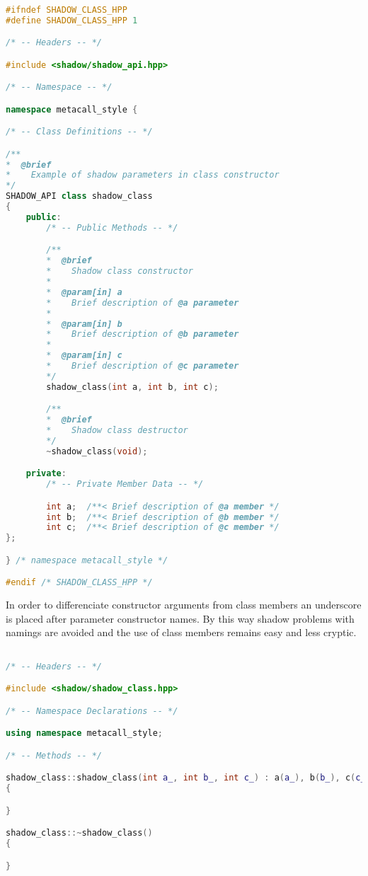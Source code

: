 \documentclass{article}
\begin{document}
% 

\begin{lstlisting}[language=C++]

#ifndef SHADOW_CLASS_HPP
#define SHADOW_CLASS_HPP 1

/* -- Headers -- */

#include <shadow/shadow_api.hpp>

/* -- Namespace -- */

namespace metacall_style {

/* -- Class Definitions -- */

/**
*  @brief
*    Example of shadow parameters in class constructor
*/
SHADOW_API class shadow_class
{
	public:
		/* -- Public Methods -- */

		/**
		*  @brief
		*    Shadow class constructor
		*
		*  @param[in] a
		*    Brief description of @a parameter
		*
		*  @param[in] b
		*    Brief description of @b parameter
		*
		*  @param[in] c
		*    Brief description of @c parameter
		*/
		shadow_class(int a, int b, int c);

		/**
		*  @brief
		*    Shadow class destructor
		*/
		~shadow_class(void);

	private:
		/* -- Private Member Data -- */

		int a;	/**< Brief description of @a member */
		int b;	/**< Brief description of @b member */
		int c;	/**< Brief description of @c member */
};

} /* namespace metacall_style */

#endif /* SHADOW_CLASS_HPP */

\end{lstlisting}

In order to differenciate constructor arguments from class members an underscore is placed after
parameter constructor names. By this way shadow problems with namings are avoided and the use of
class members remains easy and less cryptic.


% 

\begin{lstlisting}[language=C++]

/* -- Headers -- */

#include <shadow/shadow_class.hpp>

/* -- Namespace Declarations -- */

using namespace metacall_style;

/* -- Methods -- */

shadow_class::shadow_class(int a_, int b_, int c_) : a(a_), b(b_), c(c_)
{

}

shadow_class::~shadow_class()
{

}

\end{lstlisting}
\end{document}
